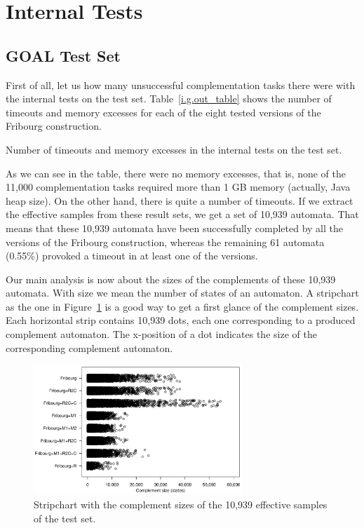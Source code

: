 \section{Internal Tests}

\subsection{GOAL Test Set}
First of all, let us how many unsuccessful complementation tasks there were with the internal tests on the \goal{} test set. Table~\ref{i.g.out_table} shows the number of timeouts and memory excesses for each of the eight tested versions of the Fribourg construction.

\begin{table}[ht]
\centering

\caption{Number of timeouts and memory excesses in the internal tests on the \goal{} test set.}
\label{i.g.out_table}
\end{table}

As we can see in the table, there were no memory excesses, that is, none of the 11,000 complementation tasks required more than 1 GB memory (actually, Java heap size). On the other hand, there is quite a number of timeouts. If we extract the effective samples from these result sets, we get a set of 10,939 automata. That means that these 10,939 automata have been successfully completed by all the versions of the Fribourg construction, whereas the remaining 61 automata (0.55\%) provoked a timeout in at least one of the versions.

Our main analysis is now about the sizes of the complements of these 10,939 automata. With size we mean the number of states of an automaton. A stripchart as the one in Figure~\ref{i.g.stripchart} is a good way to get a first glance of the complement sizes. Each horizontal strip contains 10,939 dots, each one corresponding to a produced complement automaton. The x-position of a dot indicates the size of the corresponding complement automaton.

\begin{figure}[ht]
\centering
\includegraphics[width=0.7\textwidth]{figures/r/internal/goal/s.stripchart.pdf}
\caption{Stripchart with the complement sizes of the 10,939 effective samples of the \goal{} test set.}
\label{i.g.stripchart}
\end{figure}


